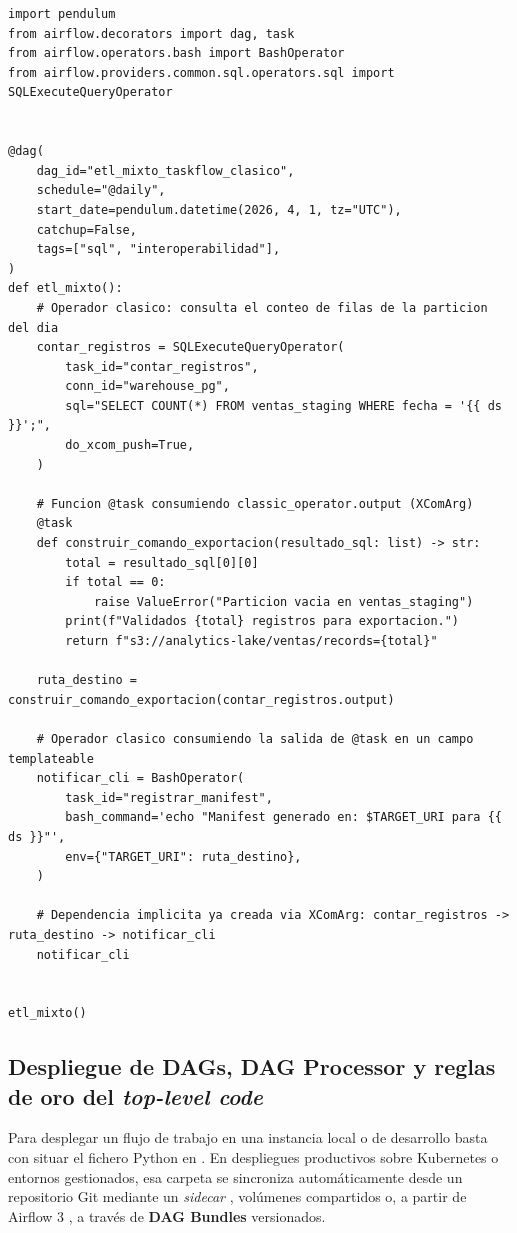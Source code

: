 \begin{lstlisting}[style=python, caption={Combinación de operadores clásicos (\code{SQLExecuteQueryOperator}, \code{BashOperator}) y \code{@task} mediante \code{.output}.}, label={lst:mezcla-operadores}]
import pendulum
from airflow.decorators import dag, task
from airflow.operators.bash import BashOperator
from airflow.providers.common.sql.operators.sql import SQLExecuteQueryOperator


@dag(
    dag_id="etl_mixto_taskflow_clasico",
    schedule="@daily",
    start_date=pendulum.datetime(2026, 4, 1, tz="UTC"),
    catchup=False,
    tags=["sql", "interoperabilidad"],
)
def etl_mixto():
    # Operador clasico: consulta el conteo de filas de la particion del dia
    contar_registros = SQLExecuteQueryOperator(
        task_id="contar_registros",
        conn_id="warehouse_pg",
        sql="SELECT COUNT(*) FROM ventas_staging WHERE fecha = '{{ ds }}';",
        do_xcom_push=True,
    )

    # Funcion @task consumiendo classic_operator.output (XComArg)
    @task
    def construir_comando_exportacion(resultado_sql: list) -> str:
        total = resultado_sql[0][0]
        if total == 0:
            raise ValueError("Particion vacia en ventas_staging")
        print(f"Validados {total} registros para exportacion.")
        return f"s3://analytics-lake/ventas/records={total}"

    ruta_destino = construir_comando_exportacion(contar_registros.output)

    # Operador clasico consumiendo la salida de @task en un campo templateable
    notificar_cli = BashOperator(
        task_id="registrar_manifest",
        bash_command='echo "Manifest generado en: $TARGET_URI para {{ ds }}"',
        env={"TARGET_URI": ruta_destino},
    )

    # Dependencia implicita ya creada via XComArg: contar_registros -> ruta_destino -> notificar_cli
    notificar_cli


etl_mixto()
\end{lstlisting}

\subsection{Despliegue de DAGs, DAG Processor y reglas de oro del \textit{top-level code}}

Para desplegar un flujo de trabajo en una instancia local o de desarrollo basta con situar el fichero Python en . En despliegues productivos sobre Kubernetes o entornos gestionados, esa carpeta se sincroniza automáticamente desde un repositorio Git mediante un \textit{sidecar} , volúmenes compartidos o, a partir de Airflow 3 , a través de \textbf{DAG Bundles} versionados.


